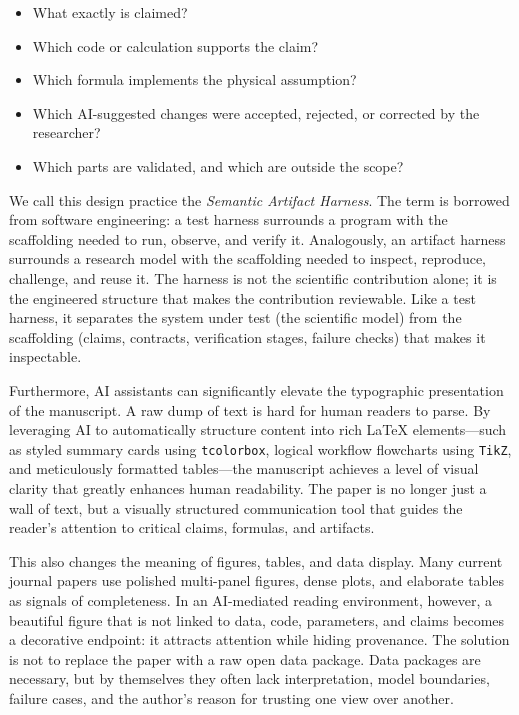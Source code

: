 \documentclass{article}
\begin{document}
\begin{itemize}
    \item What exactly is claimed?
    \item Which code or calculation supports the claim?
    \item Which formula implements the physical assumption?
    \item Which AI-suggested changes were accepted, rejected, or corrected by the researcher?
    \item Which parts are validated, and which are outside the scope?
\end{itemize}

We call this design practice the \emph{Semantic Artifact Harness}. The term is borrowed from software engineering: a test harness surrounds a program with the scaffolding needed to run, observe, and verify it. Analogously, an artifact harness surrounds a research model with the scaffolding needed to inspect, reproduce, challenge, and reuse it. The harness is not the scientific contribution alone; it is the engineered structure that makes the contribution reviewable. Like a test harness, it separates the system under test (the scientific model) from the scaffolding (claims, contracts, verification stages, failure checks) that makes it inspectable.

Furthermore, AI assistants can significantly elevate the typographic presentation of the manuscript. A raw dump of text is hard for human readers to parse. By leveraging AI to automatically structure content into rich LaTeX elements---such as styled summary cards using \texttt{tcolorbox}, logical workflow flowcharts using \texttt{TikZ}, and meticulously formatted tables---the manuscript achieves a level of visual clarity that greatly enhances human readability. The paper is no longer just a wall of text, but a visually structured communication tool that guides the reader's attention to critical claims, formulas, and artifacts.

This also changes the meaning of figures, tables, and data display. Many current journal papers use polished multi-panel figures, dense plots, and elaborate tables as signals of completeness. In an AI-mediated reading environment, however, a beautiful figure that is not linked to data, code, parameters, and claims becomes a decorative endpoint: it attracts attention while hiding provenance. The solution is not to replace the paper with a raw open data package. Data packages are necessary, but by themselves they often lack interpretation, model boundaries, failure cases, and the author's reason for trusting one view over another.
\end{document}
